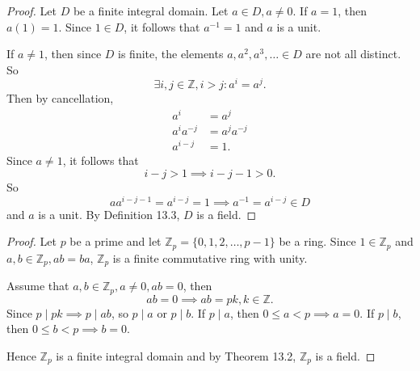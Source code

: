 \documentclass{article}
\newtheorem{theorem}{Theorem}[section]
\newtheorem{corollary}{Corollary}[theorem]
\theoremstyle{definition}
\begin{document}
\noindent{}

\begin{proof}
    Let $D$ be a finite integral domain. Let $a\in D, a\neq0$. If $a=1$, then $a(1)=1$. Since $1\in D$, it follows that $a^{-1}=1$ and $a$ is a unit.
    
    If $a\neq1$, then since $D$ is finite, the elements $a,a^2,a^3,\dots\in D$ are not all distinct. So 
    \begin{equation*}
        \exists i,j \in \mathbb{Z}, i>j: a^i=a^j.
    \end{equation*}
    Then by cancellation,
    \begin{align*}
        a^i&=a^j \\
        a^ia^{-j}&=a^ja^{-j} \\
        a^{i-j}&=1.
    \end{align*}
    Since $a\neq1$, it follows that
    \begin{equation*}
        i-j > 1 \implies i-j-1 > 0.
    \end{equation*}
    So 
    \begin{equation*}
        aa^{i-j-1}=a^{i-j}=1 \implies a^{-1}=a^{i-j} \in D
    \end{equation*}
    and $a$ is a unit. By Definition 13.3, $D$ is a field.
\end{proof}

\noindent{}

\begin{proof}
    Let $p$ be a prime and let  $\mathbb{Z}_p=\{0,1,2,\dots,p-1\}$ be a ring.
    Since $1\in\mathbb{Z}_p$ and $a,b\in\mathbb{Z}_p, ab=ba$, $\mathbb{Z}_p$ is a finite commutative ring with unity.
    
    Assume that $a,b\in\mathbb{Z}_p, a\neq0, ab=0$, then 
    \begin{equation*}
        ab=0 \implies ab=pk, k\in\mathbb{Z}.
    \end{equation*}
    Since $p\mid pk \implies p\mid ab$, so $p\mid a$ or $p\mid b$. If $p\mid a$, then $0\leq a<p\implies a=0$. If $p\mid b$, then $0\leq b<p\implies b=0$.
    
    Hence $\mathbb{Z}_p$ is a finite integral domain and by Theorem 13.2, $\mathbb{Z}_p$ is a field.
\end{proof}
\end{document}
